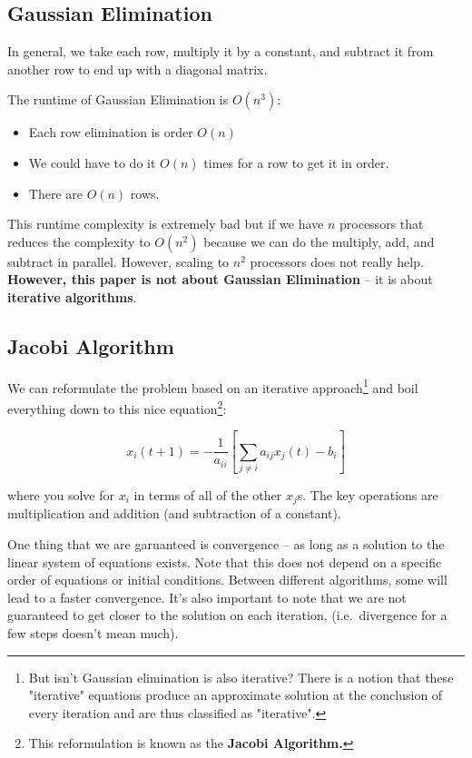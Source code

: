 \subsection{Gaussian Elimination}

In general, we take each row, multiply it by a constant, and subtract it from another row to end up with a diagonal matrix. 

The runtime of Gaussian Elimination is \( O (n^3) \):
\begin{itemize}
    \item Each row elimination is order \( O(n) \)
    \item We could have to do it \( O(n) \) times for a row to get it in order.
    \item There are \( O(n) \) rows.
\end{itemize}

This runtime complexity is extremely bad but if we have \( n \) processors that reduces the complexity to \( O(n^2) \) because we can do the multiply, add, and subtract in parallel. However, scaling to \( n^2 \) processors does not really help. \textbf{However, this paper is not about Gaussian Elimination} -- it is about \textbf{iterative algorithms}. 

\subsection{Jacobi Algorithm}

We can reformulate the problem based on an iterative approach\footnote{But isn't Gaussian elimination is also iterative? There is a notion that these "iterative" equations produce an approximate solution at the conclusion of every iteration and are thus classified as "iterative".} and boil everything down to this nice equation\footnote{This reformulation is known as the \textbf{Jacobi Algorithm.}}:

\[
x_{i}(t + 1) = -\frac{1}{a_{ii}} [ \sum_{j \neq i} a_{ij} x_{j} (t) - b_{i} ]
\]

where you solve for \( x_{i} \) in terms of all of the other \( x_{j} \)s. The key operations are  multiplication and addition (and subtraction of a constant).

One thing that we are garuanteed is convergence -- as long as a solution to the linear system of equations exists. Note that this does not depend on a specific order of equations or initial conditions. Between different algorithms, some will lead to a faster convergence. It's also important to note that we are not guaranteed to get closer to the solution on each iteration, (i.e.\ divergence for a few steps doesn't mean much).

